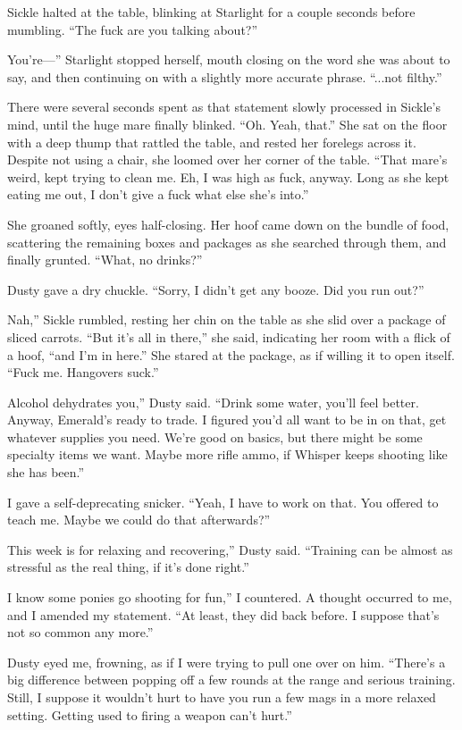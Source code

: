 Sickle halted at the table, blinking at Starlight for a couple seconds before mumbling. “The fuck are you talking about?”

\leavevmode{}You’re—” Starlight stopped herself, mouth closing on the word she was about to say, and then continuing on with a slightly more accurate phrase. “...not filthy.”

There were several seconds spent as that statement slowly processed in Sickle’s mind, until the huge mare finally blinked. “Oh. Yeah, that.” She sat on the floor with a deep thump that rattled the table, and rested her forelegs across it. Despite not using a chair, she loomed over her corner of the table. “That mare’s weird, kept trying to clean me. Eh, I was high as fuck, anyway. Long as she kept eating me out, I don’t give a fuck what else she’s into.”

She groaned softly, eyes half-closing. Her hoof came down on the bundle of food, scattering the remaining boxes and packages as she searched through them, and finally grunted. “What, no drinks?”

Dusty gave a dry chuckle. “Sorry, I didn’t get any booze. Did you run out?”

\leavevmode{}Nah,” Sickle rumbled, resting her chin on the table as she slid over a package of sliced carrots. “But it’s all in there,” she said, indicating her room with a flick of a hoof, “and I’m in here.” She stared at the package, as if willing it to open itself. “Fuck me. Hangovers suck.”

\leavevmode{}Alcohol dehydrates you,” Dusty said. “Drink some water, you’ll feel better. Anyway, Emerald’s ready to trade. I figured you’d all want to be in on that, get whatever supplies you need. We’re good on basics, but there might be some specialty items we want. Maybe more rifle ammo, if Whisper keeps shooting like she has been.”

I gave a self-deprecating snicker. “Yeah, I have to work on that. You offered to teach me. Maybe we could do that afterwards?”

\leavevmode{}This week is for relaxing and recovering,” Dusty said. “Training can be almost as stressful as the real thing, if it’s done right.”

\leavevmode{}I know some ponies go shooting for fun,” I countered. A thought occurred to me, and I amended my statement. “At least, they did back before. I suppose that’s not so common any more.”

Dusty eyed me, frowning, as if I were trying to pull one over on him. “There’s a big difference between popping off a few rounds at the range and serious training. Still, I suppose it wouldn’t hurt to have you run a few mags in a more relaxed setting. Getting used to firing a weapon can’t hurt.”

